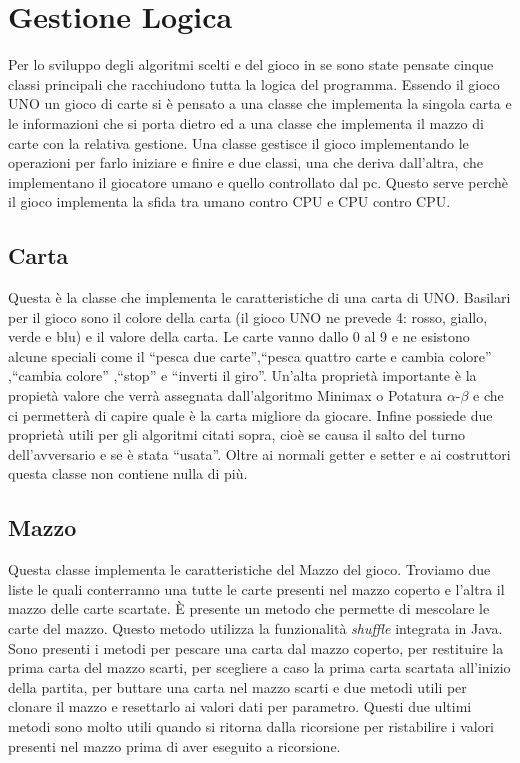 		
		
\section{Gestione Logica}		
	Per lo sviluppo degli algoritmi scelti e del gioco in se sono state pensate cinque classi principali che racchiudono tutta la logica del programma. Essendo il gioco UNO un gioco di carte si è pensato a una classe che implementa la singola carta e le informazioni che si porta dietro ed a una classe che implementa il mazzo di carte con la relativa gestione. Una classe gestisce il gioco implementando le operazioni per farlo iniziare e finire e due classi, una che deriva dall'altra, che implementano il giocatore umano e quello controllato dal pc. Questo serve perchè il gioco implementa la sfida tra umano contro CPU e CPU contro CPU.
	
	\subsection{Carta}
		Questa è la classe che implementa le caratteristiche di una carta di UNO. Basilari per il gioco sono il colore della carta (il gioco UNO ne prevede 4: rosso, giallo, verde e blu) e il valore della carta. Le carte vanno dallo 0 al 9 e ne esistono alcune speciali come il ``pesca due carte'',``pesca quattro carte e cambia colore'' ,``cambia colore'' ,``stop'' e ``inverti il giro''. Un'alta proprietà importante è la propietà valore che verrà assegnata dall'algoritmo Minimax o Potatura $\alpha$-$\beta$ e che ci permetterà di capire quale è la carta migliore da giocare. Infine possiede due proprietà utili per gli algoritmi citati sopra, cioè se causa il salto del turno dell'avversario e se è stata ``usata''. Oltre ai normali getter e setter e ai costruttori questa classe non contiene nulla di più.
		
	\subsection{Mazzo}
		Questa classe implementa le caratteristiche del Mazzo del gioco. Troviamo due liste le quali conterranno una tutte le carte presenti nel mazzo coperto e l'altra il mazzo delle carte scartate. È presente un metodo che permette di mescolare le carte del mazzo. Questo metodo utilizza la funzionalità \textit{shuffle} integrata in Java. Sono presenti i metodi per pescare una carta dal mazzo coperto, per restituire la prima carta del mazzo scarti, per scegliere a caso la prima carta scartata all'inizio della partita, per buttare una carta nel mazzo scarti e due metodi utili per clonare il mazzo e resettarlo ai valori dati per parametro. Questi due ultimi metodi sono molto utili quando si ritorna dalla ricorsione per ristabilire i valori presenti nel mazzo prima di aver eseguito a ricorsione.
		

